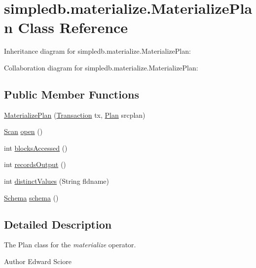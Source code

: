 \hypertarget{classsimpledb_1_1materialize_1_1MaterializePlan}{}\section{simpledb.\+materialize.\+Materialize\+Plan Class Reference}
\label{classsimpledb_1_1materialize_1_1MaterializePlan}


Inheritance diagram for simpledb.\+materialize.\+Materialize\+Plan\+:


Collaboration diagram for simpledb.\+materialize.\+Materialize\+Plan\+:
\subsection*{Public Member Functions}
\begin{DoxyCompactItemize}
\item 
\hyperlink{classsimpledb_1_1materialize_1_1MaterializePlan_afbbc97c880a46462da0ed153828a33fb}{Materialize\+Plan} (\hyperlink{classsimpledb_1_1tx_1_1Transaction}{Transaction} tx, \hyperlink{interfacesimpledb_1_1plan_1_1Plan}{Plan} srcplan)
\item 
\hyperlink{interfacesimpledb_1_1query_1_1Scan}{Scan} \hyperlink{classsimpledb_1_1materialize_1_1MaterializePlan_acf693ce6e3b9e7603286ea4c971e1d51}{open} ()
\item 
int \hyperlink{classsimpledb_1_1materialize_1_1MaterializePlan_a17e5dc3ecdd3ea848ad34c796f988da1}{blocks\+Accessed} ()
\item 
int \hyperlink{classsimpledb_1_1materialize_1_1MaterializePlan_a3e3d3cdd3bff924c476e7943d7fe70e7}{records\+Output} ()
\item 
int \hyperlink{classsimpledb_1_1materialize_1_1MaterializePlan_a98964c2c20961730b37e240e318b537d}{distinct\+Values} (String fldname)
\item 
\hyperlink{classsimpledb_1_1record_1_1Schema}{Schema} \hyperlink{classsimpledb_1_1materialize_1_1MaterializePlan_aa15451a3ee0639ccca88ca332d050b57}{schema} ()
\end{DoxyCompactItemize}


\subsection{Detailed Description}
The Plan class for the {\itshape materialize} operator. \begin{DoxyAuthor}{Author}
Edward Sciore 
\end{DoxyAuthor}


